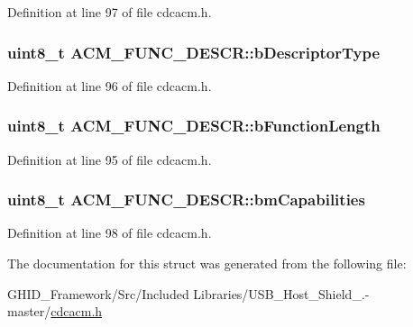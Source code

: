\-Definition at line 97 of file cdcacm.\-h.

\hypertarget{struct_a_c_m___f_u_n_c___d_e_s_c_r_a4562e71852b142b483b68deaaa360e6a}{
\subsubsection[{b\-Descriptor\-Type}]{\setlength{\rightskip}{0pt plus 5cm}uint8\-\_\-t {\bf \-A\-C\-M\-\_\-\-F\-U\-N\-C\-\_\-\-D\-E\-S\-C\-R\-::b\-Descriptor\-Type}}}\label{struct_a_c_m___f_u_n_c___d_e_s_c_r_a4562e71852b142b483b68deaaa360e6a}


\-Definition at line 96 of file cdcacm.\-h.

\hypertarget{struct_a_c_m___f_u_n_c___d_e_s_c_r_a46c41dcbc0f3fdc37c0cd411b6b3213e}{
\subsubsection[{b\-Function\-Length}]{\setlength{\rightskip}{0pt plus 5cm}uint8\-\_\-t {\bf \-A\-C\-M\-\_\-\-F\-U\-N\-C\-\_\-\-D\-E\-S\-C\-R\-::b\-Function\-Length}}}\label{struct_a_c_m___f_u_n_c___d_e_s_c_r_a46c41dcbc0f3fdc37c0cd411b6b3213e}


\-Definition at line 95 of file cdcacm.\-h.

\hypertarget{struct_a_c_m___f_u_n_c___d_e_s_c_r_a6c54b317cabd68eebd318257ab02abe4}{
\subsubsection[{bm\-Capabilities}]{\setlength{\rightskip}{0pt plus 5cm}uint8\-\_\-t {\bf \-A\-C\-M\-\_\-\-F\-U\-N\-C\-\_\-\-D\-E\-S\-C\-R\-::bm\-Capabilities}}}\label{struct_a_c_m___f_u_n_c___d_e_s_c_r_a6c54b317cabd68eebd318257ab02abe4}


\-Definition at line 98 of file cdcacm.\-h.



\-The documentation for this struct was generated from the following file\-:\begin{DoxyCompactItemize}
\item 
\-G\-H\-I\-D\-\_\-\-Framework/\-Src/\-Included Libraries/\-U\-S\-B\-\_\-\-Host\-\_\-\-Shield\-\_.-\/master/\hyperlink{cdcacm_8h}{cdcacm.\-h}\end{DoxyCompactItemize}

